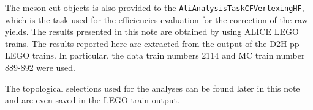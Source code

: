 The \Dstar meson cut objects is also provided to the \texttt{AliAnalysisTaskCFVertexingHF}, which is the task used for the efficiencies evaluation for the correction of the raw yields. The results presented in this note are obtained by using ALICE LEGO trains. The results reported here are extracted from the output of the D2H pp LEGO trains. In particular, the data train numbers 2114 and MC train number 889-892 were used.

The topological selections used for the analyses can be found later in this note and are even saved in the LEGO train output.
\newpage
